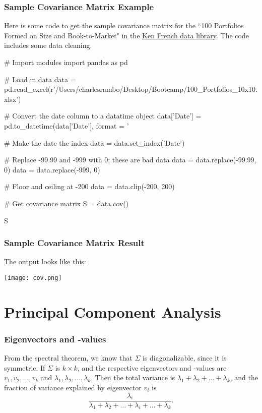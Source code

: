\documentclass{beamer}
\begin{document}
\begin{frame}[fragile]
\frametitle{Sample Covariance Matrix Example}
\small 
Here is some code to get the sample covariance matrix for the ``100 Portfolios Formed on Size and Book-to-Market" in the \href{https://mba.tuck.dartmouth.edu/pages/faculty/ken.french/data_library.html}{Ken French data library}. The code includes some data cleaning.
{
\linespread{0.8}
\tiny
\begin{verbatim*}
# Import modules
import pandas as pd

# Load in data
data = pd.read_excel(r'/Users/charlesrambo/Desktop/Bootcamp/100_Portfolios_10x10.xlsx')

# Convert the date column to a datatime object
data['Date'] = pd.to_datetime(data['Date'], format = '%Y%m')

# Make the date the index
data = data.set_index('Date')

# Replace -99.99 and -999 with 0; these are bad data
data = data.replace(-99.99, 0)
data = data.replace(-999, 0)

# Floor and ceiling at -200% and 200%, respectively
data = data.clip(-200, 200)

# Get covariance matrix
S = data.cov()

S
\end{verbatim*}
}


\end{frame}

\begin{frame}
\frametitle{Sample Covariance Matrix Result}
The output looks like this:
\begin{center}
\texttt{[image: cov.png]}
\end{center}
\end{frame}

\section{Principal Component Analysis}

\begin{frame}
\frametitle{Eigenvectors and -values}
From the spectral theorem, we know that $\Sigma$ is diagonalizable, since it is symmetric. If $\Sigma$ is $k\times k$, and the respective eigenvectors and -values are $v_1, v_2,\ldots, v_k$ and $\lambda_1, \lambda_2,\ldots, \lambda_k$. Then the total variance is $\lambda_1 + \lambda_2+\ldots+\lambda_k$, and the fraction of variance explained by eigenvector $v_i$ is
$$
\frac{\lambda_i}{\lambda_1 +\lambda_2+\ldots+\lambda_i+\ldots+\lambda_k}.
$$
\end{frame}
\end{document}
